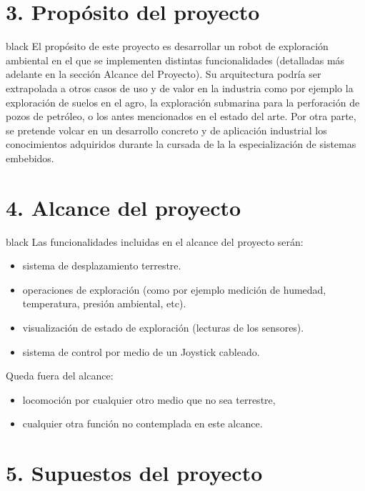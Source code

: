 \documentclass[
11pt, %
]{charter}
\begin{document}
\section{3. Propósito del proyecto}
\label{sec:proposito}

\begin{consigna}{black}
El propósito de este proyecto es desarrollar un robot de exploración ambiental en el que se implementen distintas  funcionalidades (detalladas más adelante en la sección Alcance del Proyecto). Su arquitectura podría ser extrapolada a otros casos de uso y de valor en la industria como por ejemplo la exploración de suelos en el agro, la exploración submarina para la perforación de pozos de petróleo, o los antes mencionados en el estado del arte.
Por otra parte, se pretende volcar en un desarrollo concreto y de aplicación industrial los conocimientos adquiridos durante la cursada de la la especialización de sistemas embebidos.

\end{consigna}

\section{4. Alcance del proyecto}
\label{sec:alcance}

\begin{consigna}{black}
Las funcionalidades incluidas en el alcance del proyecto serán:
\begin{itemize}
	\item sistema de desplazamiento terrestre.
	\item operaciones de exploración (como por ejemplo medición de humedad, temperatura, presión ambiental, etc).
	\item visualización de estado de exploración (lecturas de los sensores).
	\item sistema de control por medio de un Joystick cableado.
\end{itemize}

Queda fuera del alcance:
\begin{itemize}
	\item locomoción por cualquier otro medio que no sea terrestre,
	\item cualquier otra función no contemplada en este alcance.
\end{itemize}
\end{consigna}


\section{5. Supuestos del proyecto}
\label{sec:supuestos}
\end{document}

